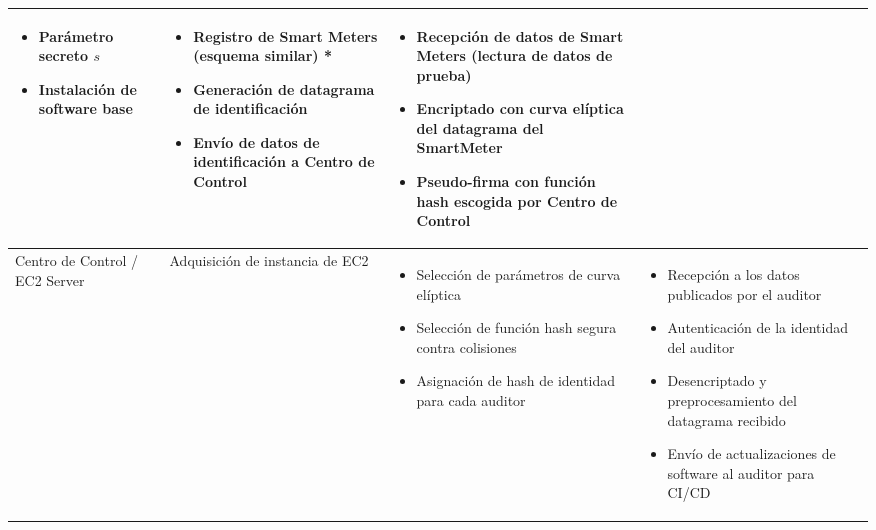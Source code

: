\documentclass{article}
\begin{document}
\begin{table}[htbp]
{\begin{tabular}{| m{2cm} | m{3cm} | m{5cm} | m{9cm} |}
\begin{itemize}[noitemsep]
                        \item Parámetro secreto $s$
                        \item Instalación de software base
                    \end{itemize} &
                    \begin{itemize}[noitemsep]
                        \item Registro de Smart Meters (esquema similar) *
                        \item Generación de datagrama de identificación
                        \item Envío de datos de identificación a Centro de Control
                    \end{itemize} &
                    \begin{itemize}[noitemsep]
                        \item Recepción de datos de Smart Meters (lectura de datos de prueba)
                        \item Encriptado con curva elíptica del datagrama del SmartMeter
                        \item Pseudo-firma con función hash escogida por Centro de Control
                    \end{itemize} \\
                    \hline
                    Centro de Control / EC2 Server &
                    Adquisición de instancia de EC2 &
                    \begin{itemize}[noitemsep]
                        \item Selección de parámetros de curva elíptica
                        \item Selección de función hash segura contra colisiones
                        \item Asignación de hash de identidad para cada auditor
                    \end{itemize} &
                    \begin{itemize}[noitemsep]
                        \item Recepción a los datos publicados por el auditor
                        \item Autenticación de la identidad del auditor
                        \item Desencriptado y preprocesamiento del datagrama recibido
                        \item Envío de actualizaciones de software al auditor para CI/CD

\end{itemize}
\end{tabular}}
\end{table}
\end{document}
